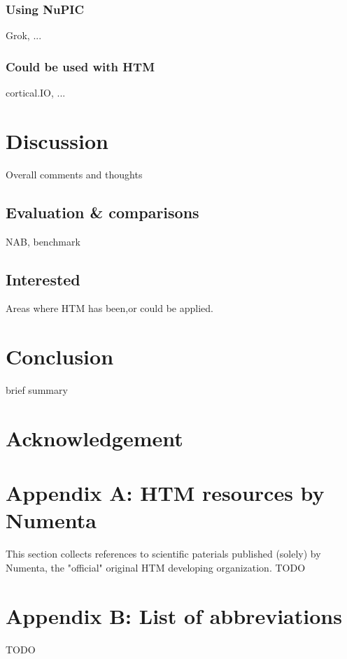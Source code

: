 \documentclass[a4,IEEEconf]{article}
\begin{document}
\subsubsection{Using NuPIC}
Grok, ...
\subsubsection{Could be used with HTM}
cortical.IO, ...

\section{Discussion}
Overall comments and thoughts
\subsection{Evaluation \& comparisons}
NAB, benchmark
\subsection{Interested}
Areas where HTM has been,or could be applied. 

\section{Conclusion}
brief summary

\section{Acknowledgement}

\section{Appendix A: HTM resources by Numenta}
This section collects references to scientific paterials published (solely) by Numenta, the "official" original HTM developing organization. 
TODO
\section{Appendix B: List of abbreviations}
TODO


\end{document}
